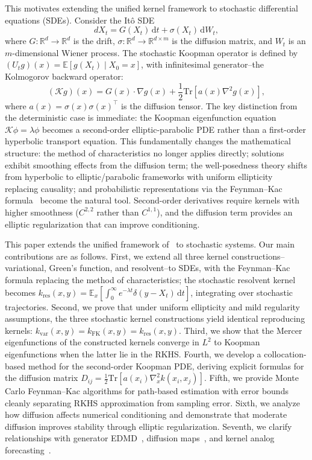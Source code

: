 \documentclass[11pt,a4paper]{article}
\newcommand{\R}{\mathbb{R}}
\newcommand{\E}{\mathbb{E}}
\newcommand{\Tr}{\mathrm{Tr}}
\newcommand{\dt}{\,\mathrm{d}t}
\newcommand{\dW}{\,\mathrm{d}W}
\newcommand{\Koop}{\mathcal{K}}
\begin{document}
This motivates extending the unified kernel framework to stochastic differential equations (SDEs). Consider the It\^{o} SDE
\begin{equation}\label{eq:sde}
dX_t = G(X_t) \dt + \sigma(X_t) \dW_t,
\end{equation}
where $G: \R^d \to \R^d$ is the drift, $\sigma: \R^d \to \R^{d \times m}$ is the diffusion matrix, and $W_t$ is an $m$-dimensional Wiener process. The stochastic Koopman operator is defined by $(U_t g)(x) = \E[g(X_t) \mid X_0 = x]$, with infinitesimal generator--the Kolmogorov backward operator:
\begin{equation}\label{eq:stoch_generator}
(\Koop g)(x) = G(x) \cdot \nabla g(x) + \frac{1}{2} \Tr\left[a(x) \nabla^2 g(x)\right],
\end{equation}
where $a(x) = \sigma(x)\sigma(x)^\top$ is the diffusion tensor. The key distinction from the deterministic case is immediate: the Koopman eigenfunction equation $\Koop \phi = \lambda \phi$ becomes a second-order elliptic-parabolic PDE rather than a first-order hyperbolic transport equation. This fundamentally changes the mathematical structure: the method of characteristics no longer applies directly; solutions exhibit smoothing effects from the diffusion term; the well-posedness theory shifts from hyperbolic to elliptic/parabolic frameworks with uniform ellipticity replacing causality; and probabilistic representations via the Feynman--Kac formula~\cite{Kac1949} become the natural tool. Second-order derivatives require kernels with higher smoothness ($C^{2,2}$ rather than $C^{1,1}$), and the diffusion term provides an elliptic regularization that can improve conditioning.

This paper extends the unified framework of~\cite{HamziOwhadiVaidya2024} to stochastic systems. Our main contributions are as follows. First, we extend all three kernel constructions--variational, Green's function, and resolvent--to SDEs, with the Feynman--Kac formula replacing the method of characteristics; the stochastic resolvent kernel becomes $k_{\mathrm{res}}(x,y) = \E_x[\int_0^\infty e^{-\lambda t} \delta(y - X_t)\dt]$, integrating over stochastic trajectories. Second, we prove that under uniform ellipticity and mild regularity assumptions, the three stochastic kernel constructions yield identical reproducing kernels: $k_{\mathrm{var}}(x,y) = k_{\mathrm{FK}}(x,y) = k_{\mathrm{res}}(x,y)$. Third, we show that the Mercer eigenfunctions of the constructed kernels converge in $L^2$ to Koopman eigenfunctions when the latter lie in the RKHS. Fourth, we develop a collocation-based method for the second-order Koopman PDE, deriving explicit formulas for the diffusion matrix $D_{ij} = \frac{1}{2}\Tr[a(x_i)\nabla_x^2 k(x_i, x_j)]$. Fifth, we provide Monte Carlo Feynman--Kac algorithms for path-based estimation with error bounds cleanly separating RKHS approximation from sampling error. Sixth, we analyze how diffusion affects numerical conditioning and demonstrate that moderate diffusion improves stability through elliptic regularization. Seventh, we clarify relationships with generator EDMD~\cite{Klus2020}, diffusion maps~\cite{Coifman2006}, and kernel analog forecasting~\cite{Alexander2020}.
\end{document}
